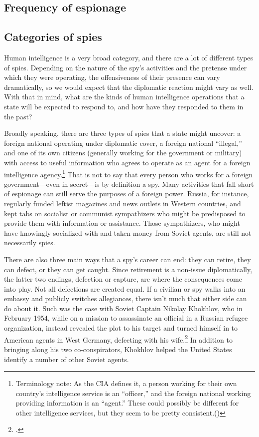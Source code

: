 \documentclass{memoir}
\begin{document}
\begin{refsegment}
\section{Frequency of espionage}
\subsection{Categories of spies}
Human intelligence is a very broad category, and there are a lot of different types of spies. Depending on the nature of the spy's activities and the pretense under which they were operating, the offensiveness of their presence can vary dramatically, so we would expect that the diplomatic reaction might vary as well. With that in mind, what are the kinds of human intelligence operations that a state will be expected to respond to, and how have they responded to them in the past?

Broadly speaking, there are three types of spies that a state might uncover: a foreign national operating under diplomatic cover, a foreign national ``illegal,'' and one of its own citizens (generally working for the government or military) with access to useful information who agrees to operate as an agent for a foreign intelligence agency.\footnote{Terminology note: As the CIA defines it, a person working for their own country's intelligence service is an ``officer,'' and the foreign national working providing information is an ``agent.'' These could possibly be different for other intelligence services, but they seem to be pretty consistent.(\cite{cia_insider_2019})} That is not to say that every person who works for a foreign government---even in secret---is by definition a spy. Many activities that fall short of espionage can still serve the purposes of a foreign power. Russia, for instance, regularly funded leftist magazines and news outlets in Western countries, and kept tabs on socialist or communist sympathizers who might be predisposed to provide them with information or assistance. Those sympathizers, who might have knowingly socialized with and taken money from Soviet agents, are still not necessarily spies.

There are also three main ways that a spy's career can end: they can retire, they can defect, or they can get caught. Since retirement is a non-issue diplomatically, the latter two endings, defection or capture, are where the consequences come into play. Not all defections are created equal. If a civilian or spy walks into an embassy and publicly switches allegiances, there isn't much that either side can do about it. Such was the case with Soviet Captain Nikolay Khokhlov, who in February 1954, while on a mission to assassinate an official in a Russian refugee organization, instead revealed the plot to his target and turned himself in to American agents in West Germany, defecting with his wife.\footcite[Captain Khoklov repeatedly emphasized at the press conference that his decision to defect was inspired by his wife Yanina, who told him that ``she would never permit their child to have an assasin as a father.'']{handler_another_1954} In addition to bringing along his two co-conspirators, Khokhlov helped the United States identify a number of other Soviet agents.


\end{refsegment}
\end{document}

